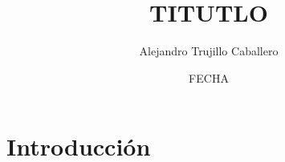 \documentclass[11pt]{article}
\title{\textbf{\huge{TITUTLO}}}
\author{Alejandro Trujillo Caballero}
\date{FECHA}
\begin{document}
\maketitle
\thispagestyle{empty}
\newpage

\tableofcontents
\newpage

\section{Introducción}
\end{document}
